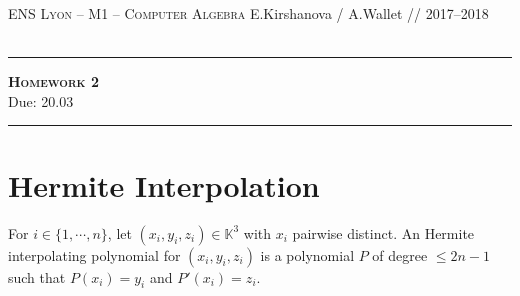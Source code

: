 \documentclass[11pt]{exam}
\theoremstyle{definition}
\begin{document}
{\noindent
   \textsc{ENS Lyon --  M1 -- Computer Algebra}
 \hfill { E.Kirshanova / A.Wallet // 2017--2018\\
   	}\\
  }
  \hrule
  \begin{center}
    {\Large\textbf{
   \textsc{Homework 2} \\[5pt]
    }
	Due:  20.03
	} 
  \end{center}
  \hrule \vspace{5mm}

\thispagestyle{empty}

\vspace{0.2cm}



\section{Hermite Interpolation}

For $i \in \{1,\cdots,n\}$, let $(x_i, y_i, z_i) \in \mathbb{K}^3$ with $x_i$
pairwise distinct. An Hermite interpolating polynomial for $(x_i,
y_i, z_i)$ is a polynomial $P$ of degree $\leq 2n-1$ such that $P(x_i) =
y_i$ and $P'(x_i) = z_i$.
\end{document}
